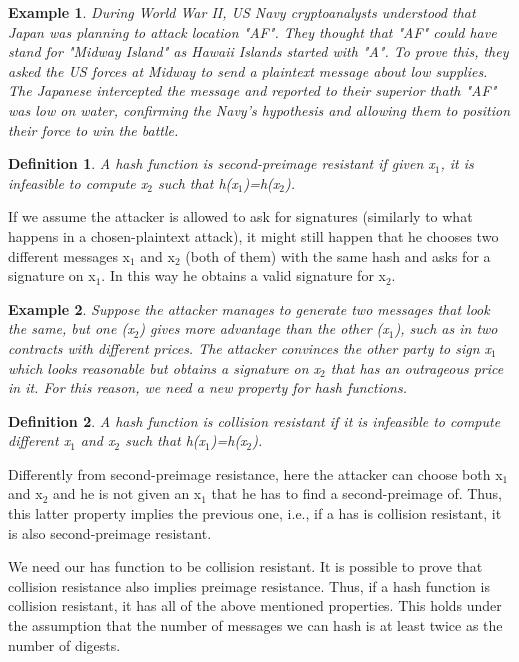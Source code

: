 \documentclass[a4paper, 12pt]{report}
\newtheorem{definition}{\textbf{Definition}}
\newtheorem{example}{\textbf{Example}}
\begin{document}
\begin{example}
	During World War II, US Navy cryptoanalysts understood that Japan was planning to attack location "AF". They thought that "AF" could have stand for "Midway Island" as Hawaii Islands started with "A". To prove this, they asked the US forces at Midway to send a plaintext message about low supplies. The Japanese intercepted the message and reported to their superior thath "AF" was low on water, confirming the Navy's hypothesis and allowing them to position their force to win the battle.
\end{example}

\begin{definition}
	A hash function is second-preimage resistant if given x$_1$, it is infeasible to compute x$_2$ such that h(x$_1$)=h(x$_2$).
\end{definition}

If we assume the attacker is allowed to ask for signatures (similarly to what happens in a chosen-plaintext attack), it might still happen that he chooses two different messages x$_1$ and x$_2$ (both of them) with the same hash and asks for a signature on x$_1$. In this way he obtains a valid signature for x$_2$.

\begin{example}
	Suppose the attacker manages to generate two messages that look the same, but one (x$_2$) gives more advantage than the other (x$_1$), such as in two contracts with different prices. The attacker convinces the other party to sign x$_1$ which looks reasonable but obtains a signature on x$_2$ that has an outrageous price in it. For this reason, we need a new property for hash functions.
\end{example}

\begin{definition}
	A hash function is collision resistant if it is infeasible to compute different x$_1$ and x$_2$ such that h(x$_1$)=h(x$_2$). 
\end{definition}

Differently from second-preimage resistance, here the attacker can choose both x$_1$ and x$_2$ and he is not given an x$_1$ that he has to find a second-preimage of. Thus, this latter property implies the previous one, i.e., if a has is collision resistant, it is also second-preimage resistant.

We need our has function to be collision resistant. It is possible to prove that collision resistance also implies preimage resistance. Thus, if a hash function is collision resistant, it has all of the above mentioned properties. This holds under the assumption that the number of messages we can hash is at least twice as the number of digests.
\end{document}
